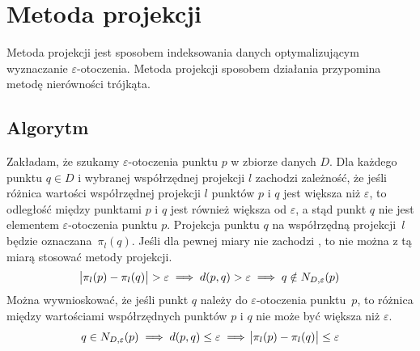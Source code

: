 \section{Metoda projekcji}
Metoda projekcji jest sposobem indeksowania danych optymalizującym wyznaczanie $ \varepsilon $-otoczenia. Metoda projekcji sposobem działania przypomina metodę nierówności trójkąta.
\subsection{Algorytm}
Zakładam, że szukamy $ \varepsilon $-otoczenia punktu $ p $ w zbiorze danych $ D $. Dla każdego punktu $ q \in D $ i wybranej współrzędnej projekcji $ l $ zachodzi zależność, że jeśli różnica wartości współrzędnej projekcji $ l $ punktów $ p $ i $ q $ jest większa niż $ \varepsilon $, to odległość między punktami $ p $ i $ q $ jest również większa od $ \varepsilon $, a stąd punkt $ q $ nie jest elementem $ \varepsilon $-otoczenia punktu $ p $. Projekcja punktu $ q $ na współrzędną \mbox{projekcji $ l $} będzie \mbox{oznaczana $ \pi_l(q) $}. Jeśli dla pewnej miary nie zachodzi , to nie można z tą miarą stosować metody projekcji. 
\begin{equation} \label{eq:projection-raw}
	\abs{\pi_l(p) - \pi_l(q)} > \varepsilon \implies d(p,q) > \varepsilon	\implies q \notin N_{D,\varepsilon}(p)
\end{equation}
Można wywnioskować, że jeśli punkt $ q $ należy do $ \varepsilon $-otoczenia \mbox{punktu $ p $}, to różnica między wartościami współrzędnych punktów $ p $ i $ q $ nie może być większa niż $ \varepsilon $.
\begin{equation}\label{eq:projection}
	q \in N_{D,\varepsilon}(p) \implies d(p,q) \le \varepsilon \implies \abs{\pi_l(p) - \pi_l(q)} \le \varepsilon
\end{equation}
